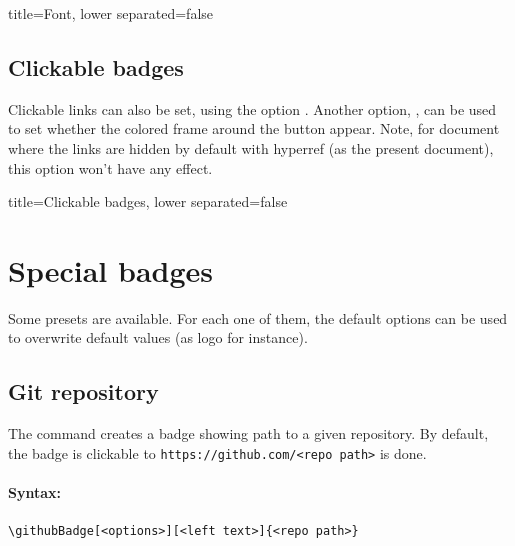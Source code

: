 \begin{tcblisting}{title={Font}, lower separated=false}
\end{tcblisting}



\subsection{Clickable badges}


Clickable links can also be set, using the option .
Another option, , can be used to set whether the colored frame around the button appear.
Note, for document where the links are hidden by default with \textsf{hyperref} (as the present document), this option won't have any effect.

\begin{tcblisting}{title={Clickable badges}, lower separated=false}
\end{tcblisting}



\section{Special badges}
\label{sec:special-badges}


Some presets are available.
For each one of them, the default options can be used to overwrite default values (as logo for instance).

\subsection{Git repository}

The \mintex{\githubBadge} command creates a badge showing path to a given repository.
By default, the badge is clickable to \texttt{https://github.com/<repo path>} is done.


\paragraph{Syntax:}
\begin{verbatim}
\githubBadge[<options>][<left text>]{<repo path>}
\end{verbatim}

